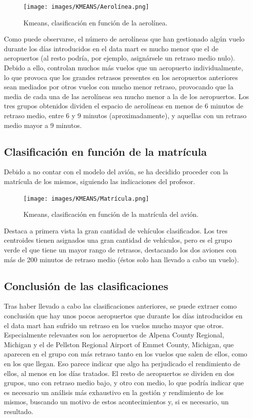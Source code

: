 \documentclass{article}
\begin{document}
\begin{figure}[H]
    \centering
    \texttt{[image: images/KMEANS/Aerolínea.png]}
    \caption{Kmeans, clasificación en función de la aerolínea. }
    \label{fig:aero}
\end{figure}

Como puede observarse, el número de aerolíneas que han gestionado algún vuelo durante los días introducidos en el data mart es mucho menor que el de aeropuertos (al resto podría, por ejemplo, asignársele un retraso medio nulo). Debido a ello, controlan muchos más vuelos que un aeropuerto individualmente, lo que provoca que los grandes retrasos presentes en los aeropuertos anteriores sean mediados por otros vuelos con mucho menor retraso, provocando que la media de cada una de las aerolíneas sea mucho menor a la de los aeropuertos. Los tres grupos obtenidos dividen el espacio de aerolíneas en menos de 6 minutos de retraso medio, entre 6 y 9 minutos (aproximadamente), y aquellas con un retraso medio mayor a 9 minutos.

\newpage
\subsection{Clasificación en función de la matrícula}
 Debido a no contar con el modelo del avión, se ha decidido proceder con la matrícula de los mismos, siguiendo las indicaciones del profesor.
\begin{figure}[H]
    \centering
    \texttt{[image: images/KMEANS/Matrícula.png]}
    \caption{Kmeans, clasificación en función de la matrícula del avión. }
    \label{fig:mat}
\end{figure}

Destaca a primera vista la gran cantidad de vehículos clasificados. Los tres centroides tienen asignados una gran cantidad de vehículos, pero es el grupo verde el que tiene un mayor rango de retrasos, destacando los dos aviones con más de 200 minutos de retraso medio (éstos solo han llevado a cabo un vuelo).

\subsection{Conclusión de las clasificaciones}
Tras haber llevado a cabo las clasificaciones anteriores, se puede extraer como conclusión que hay unos pocos aeropuertos que durante los días introducidos en el data mart han sufrido un retraso en los vuelos mucho mayor que otros. Especialmente relevantes son los aeropuertos de Alpena County Regional, Michigan y el de Pellston Regional Airport of Emmet County, Michigan, que aparecen en el grupo con más retraso tanto en los vuelos que salen de ellos, como en los que llegan. Eso parece indicar que algo ha perjudicado el rendimiento de ellos, al menos en los días tratados. El resto de aeropuertos se dividen en dos grupos, uno con retraso medio bajo, y otro con medio, lo que podría indicar que es necesario un análisis más exhaustivo en la gestión y rendimiento de los mismos, buscando un motivo de estos acontecimientos y, si es necesario, un resultado.\\
\end{document}
